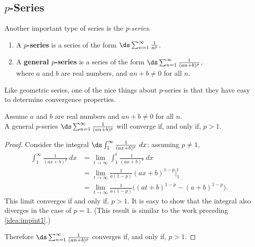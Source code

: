 \subsection{\texorpdfstring{$p$}{p}-Series}

Another important type of series is the \emph{p-series}.

{\begin{enumerate}
\item	A \textbf{$p$-series} is a series of the form
\qquad$\ds\sum_{n=1}^\infty \frac{1}{n^p}$.
\item	A \textbf{general $p$-series} is a series of the form 
\qquad$\ds\sum_{n=1}^\infty \frac{1}{(an+b)^p}$,\medskip\\
where $a$ and $b$ are real numbers, and $an+b\neq 0$ for all $n$.
\end{enumerate}}

Like geometric series, one of the nice things about $p$-series is that they have easy to determine convergence properties.

{Assume $a$ and $b$ are real numbers and  $an+b\neq 0$ for all $n$.\\
A general $p$-series $\ds\sum_{n=1}^\infty \frac{1}{(an+b)^p}$ will converge if, and only if, $p>1$.
}

\begin{proof}
Consider the integral $\ds\int_1^\infty \frac1{(ax+b)^p}\ dx$; assuming $p\neq 1$,
\begin{align*}
	\int_1^\infty \frac1{(ax+b)^p}\ dx
	&= \lim_{t\to\infty} \int_1^t \frac1{(ax+b)^p}\ dx \\
	&= \lim_{t\to\infty} \frac{1}{a(1-p)}(ax+b)^{1-p}\Big|_1^t\\
	&= \lim_{t\to\infty} \frac{1}{a(1-p)}\big((at+b)^{1-p}-(a+b)^{1-p}\big).
\end{align*}
This limit converges if and only if, $p>1$. It is easy to show that the integral also diverges in the case of $p=1$. (This result is similar to the work preceding \autoref{idea:impint1}.)

Therefore $\ds \sum_{n=1}^\infty \frac 1{(an+b)^p}$ converges if, and only if, $p>1$.
\end{proof}

